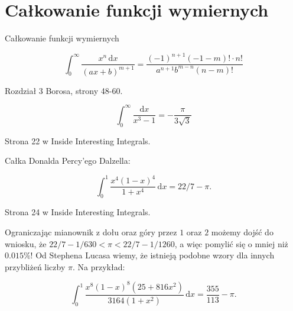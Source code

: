 %

\section{Całkowanie funkcji wymiernych}
Całkowanie funkcji wymiernych

\begin{problem}
\begin{equation}
    \int_0^\infty \frac{x^n \,\mathrm{d}x}{(ax+b)^{m+1}}  = \frac{(-1)^{n+1} (-1-m)! \cdot n!}{a^{n+1} b^{m-n} (n-m)!}
\end{equation}
\end{problem}

\begin{solution}
    Rozdział 3 Borosa, strony 48-60.
\end{solution}

\begin{problem}
\begin{equation}
    \int_0^\infty \frac{\mathrm{d}x}{x^3 - 1} = - \frac{\pi}{3\sqrt{3}}
\end{equation}
\end{problem}

\begin{solution}
    Strona 22 w Inside Interesting Integrals.
\end{solution}


Całka Donalda Percy'ego Dalzella:

\begin{problem}
\begin{equation}
    \int_0^1 \frac{x^4(1-x)^4}{1 + x^4} \,\mathrm{d}x = 22/7 - \pi.
\end{equation}
\end{problem}

\begin{solution}
    Strona 24 w Inside Interesting Integrals.
\end{solution}

Ograniczając mianownik z dołu oraz góry przez $1$ oraz $2$ możemy dojść do wniosku, że $22/7 - 1/630 < \pi < 22/7 - 1/1260$, a więc pomylić się o mniej niż $0.015\%$!
Od Stephena Lucasa wiemy, że istnieją podobne wzory dla innych przybliżeń liczby $\pi$.
Na przykład:
\begin{problem}
\begin{equation}
    \int_0^1 \frac {x^8(1-x)^8 (25+816x^2)}{3164 (1+x^2)} \,\mathrm{d} x = \frac {355}{113} - \pi.
\end{equation}
\end{problem}

